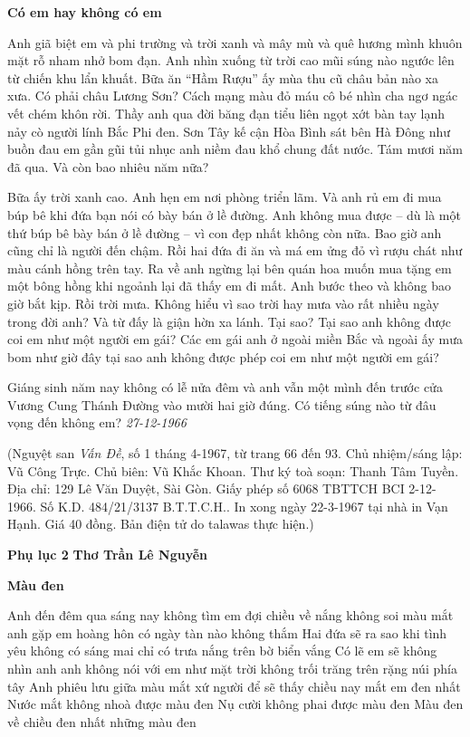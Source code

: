 \documentclass[../main.tex]{subfiles}
\begin{document}
\begin{multicols}{2}
        
\textbf{Có em hay không có em}        
 
Anh giã biệt em và phi trường và trời xanh và mây mù và quê hương mình khuôn mặt rỗ nham nhở bom đạn. Anh nhìn xuống từ trời cao mũi súng nào ngước lên từ chiến khu lẩn khuất. Bữa ăn “Hầm Rượu” ấy mùa thu cũ châu bản nào xa xưa. Có phải châu Lương Sơn? Cách mạng màu đỏ máu cô bé nhìn cha ngơ ngác vết chém khôn rời. Thầy anh qua đời băng đạn tiểu liên ngọt xớt bàn tay lạnh nảy cò người lính Bắc Phi đen. Sơn Tây kế cận Hòa Bình sát bên Hà Đông như buồn đau em gần gũi tủi nhục anh niềm đau khổ chung đất nước. Tám mươi năm đã qua. Và còn bao nhiêu năm nữa? 
 
Bữa ấy trời xanh cao. Anh hẹn em nơi phòng triển lãm. Và anh rủ em đi mua búp bê khi đứa bạn nói có bày bán ở lề đường. Anh không mua được – dù là một thứ búp bê bày bán ở lề đường – vì con đẹp nhất không còn nữa. Bao giờ anh cũng chỉ là người đến chậm. Rồi hai đứa đi ăn và má em ửng đỏ vì rượu chát như màu cánh hồng trên tay. Ra về anh ngừng lại bên quán hoa muốn mua tặng em một bông hồng khi ngoảnh lại đã thấy em đi mất. Anh bước theo và không bao giờ bắt kịp. Rồi trời mưa. Không hiểu vì sao trời hay mưa vào rất nhiều ngày trong đời anh? Và từ đấy là giận hờn xa lánh. Tại sao? Tại sao anh không được coi em như một người em gái? Các em gái anh ở ngoài miền Bắc và ngoài ấy mưa bom như giờ đây tại sao anh không được phép coi em như một người em gái? 
 
Giáng sinh năm nay không có lễ nửa đêm và anh vẫn một mình đến trước cửa Vương Cung Thánh Đường vào mười hai giờ đúng. Có tiếng súng nào từ đâu vọng đến không em? 
\textit{27-12-1966} 
 
(Nguyệt san \textit{Vấn Đề}, số 1 tháng 4-1967, từ trang 66 đến 93. Chủ nhiệm/sáng lập: Vũ Công Trực. Chủ biên: Vũ Khắc Khoan. Thư ký toà soạn: Thanh Tâm Tuyền. Địa chỉ: 129 Lê Văn Duyệt, Sài Gòn. Giấy phép số 6068 TBTTCH BCI 2-12-1966. Số K.D. 484/21/3137 B.T.T.C.H.. In xong ngày 22-3-1967 tại nhà in Vạn Hạnh. Giá 40 đồng. Bản điện tử do talawas thực hiện.) 
 
 
 
\textbf{Phụ lục 2} 
\textbf{Thơ Trần Lê Nguyễn } 
        
\textbf{Màu đen}        
 
Anh đến đêm qua 
sáng nay không tìm em 
đợi chiều về nắng không soi màu mắt 
anh gặp em hoàng hôn 
có ngày tàn nào không thắm 
Hai đứa sẽ ra sao 
khi tình yêu không có sáng mai 
chỉ có trưa nắng trên bờ biển vắng 
Có lẽ em sẽ không nhìn anh 
anh không nói với em 
như mặt trời không trối trăng trên rặng núi phía tây 
Anh phiêu lưu giữa màu mắt xứ người 
để sẽ thấy chiều nay mắt em đen nhất 
Nước mắt không nhoà được màu đen 
Nụ cười không phai được màu đen 
Màu đen về chiều đen nhất những màu đen 
 

\end{multicols}
\end{document}
